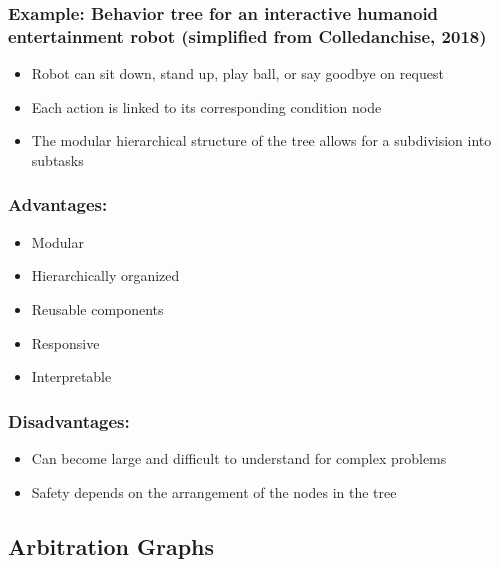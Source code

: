 \subsubsection*{Example: Behavior tree for an interactive humanoid entertainment robot (simplified from Colledanchise, 2018)}
\begin{itemize}
    \item Robot can sit down, stand up, play ball, or say goodbye on request
    \item Each action is linked to its corresponding condition node
    \item The modular hierarchical structure of the tree allows for a subdivision into subtasks
\end{itemize}

\subsubsection*{Advantages:}
\begin{itemize}
    \item Modular
    \item Hierarchically organized
    \item Reusable components
    \item Responsive
    \item Interpretable
\end{itemize}

\subsubsection*{Disadvantages:}
\begin{itemize}
    \item Can become large and difficult to understand for complex problems
    \item Safety depends on the arrangement of the nodes in the tree
\end{itemize}

\subsection*{Arbitration Graphs}

